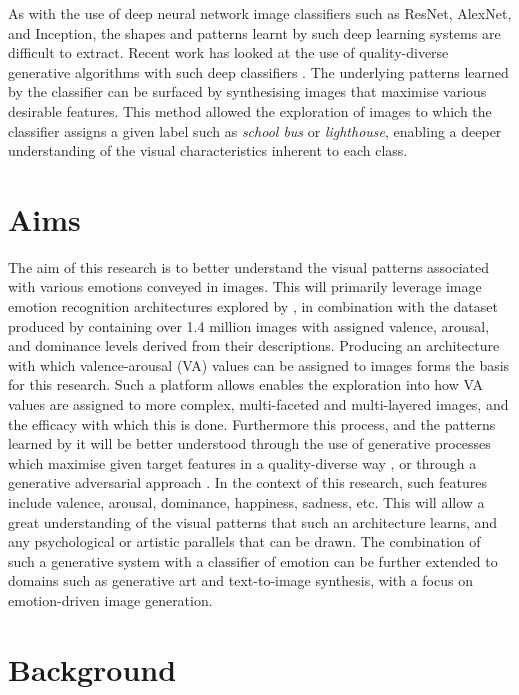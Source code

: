 \documentclass{article}
\begin{document}
As with the use of deep neural network image classifiers such as ResNet, AlexNet, and Inception, the shapes and patterns learnt by such deep learning systems are difficult to extract.
Recent work has looked at the use of quality-diverse generative algorithms with such deep classifiers \citep{nguyen2015deep, nguyen2015innovation}.
The underlying patterns learned by the classifier can be surfaced by synthesising images that maximise various desirable features.
This method allowed the exploration of images to which the classifier assigns a given label such as \textit{school bus} or \textit{lighthouse}, enabling a deeper understanding of the visual characteristics inherent to each class.

\section{Aims}
The aim of this research is to better understand the visual patterns associated with various emotions conveyed in images.
This will primarily leverage image emotion recognition architectures explored by \citet{kim2018building}, in combination with the dataset produced by \citet{zhao2016predicting} containing over 1.4 million images with assigned valence, arousal, and dominance levels derived from their descriptions.
Producing an architecture with which valence-arousal (VA) values can be assigned to images forms the basis for this research.
Such a platform allows enables the exploration into how VA values are assigned to more complex, multi-faceted and multi-layered images, and the efficacy with which this is done.
Furthermore this process, and the patterns learned by it will be better understood through the use of generative processes which maximise given target features in a quality-diverse way \citep{nguyen2015innovation, nguyen2015deep}, or through a generative adversarial approach \citep{tan2017artgan}.
In the context of this research, such features include valence, arousal, dominance, happiness, sadness, etc.
This will allow a great understanding of the visual patterns that such an architecture learns, and any psychological or artistic parallels that can be drawn.
The combination of such a generative system with a classifier of emotion can be further extended to domains such as generative art and text-to-image synthesis, with a focus on emotion-driven image generation.


\section{Background}
\end{document}
